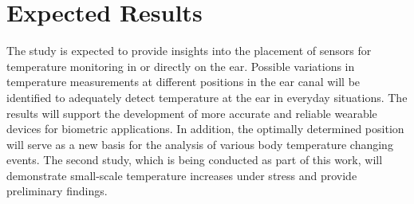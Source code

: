 \section{Expected Results}
\label{ch:Introduction:ExpectedResults}
The study is expected to provide insights into the placement of sensors for temperature monitoring in or directly on the ear.
Possible variations in temperature measurements at different positions in the ear canal will be identified to adequately detect temperature at the ear in everyday situations.
The results will support the development of more accurate and reliable wearable devices for biometric applications. 
In addition, the optimally determined position will serve as a new basis for the analysis of various body temperature changing events.
The second study, which is being conducted as part of this work, will demonstrate small-scale temperature increases under stress and provide preliminary findings.